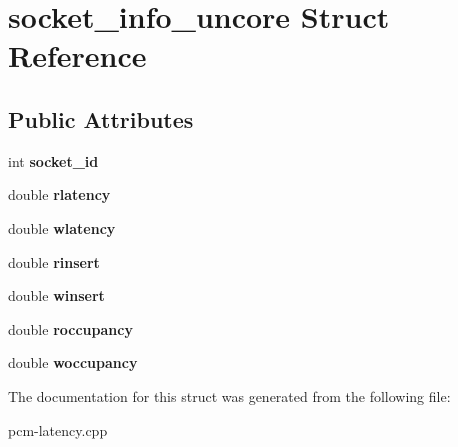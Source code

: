 \section{socket\+\_\+info\+\_\+uncore Struct Reference}
\label{structsocket__info__uncore}
\subsection*{Public Attributes}
\begin{DoxyCompactItemize}
\item 
\mbox{\label{structsocket__info__uncore_a8f10118ed315b4006d82786906e4e84b}} 
int {\bfseries socket\+\_\+id}
\item 
\mbox{\label{structsocket__info__uncore_acc0e6d8e56a541bfc3d01f55a337a4a5}} 
double {\bfseries rlatency}
\item 
\mbox{\label{structsocket__info__uncore_ae1aa840a4fa543a37e024fd9c643af11}} 
double {\bfseries wlatency}
\item 
\mbox{\label{structsocket__info__uncore_a92cb84a8b93d234aeb374f6883fae571}} 
double {\bfseries rinsert}
\item 
\mbox{\label{structsocket__info__uncore_ad544772ca5b28f1622ff0301f6c1bdac}} 
double {\bfseries winsert}
\item 
\mbox{\label{structsocket__info__uncore_aeddc9f897fb364da754a8b8aa7f9b120}} 
double {\bfseries roccupancy}
\item 
\mbox{\label{structsocket__info__uncore_a2af6499e98cbb97ea99c7b4f145da326}} 
double {\bfseries woccupancy}
\end{DoxyCompactItemize}


The documentation for this struct was generated from the following file\+:\begin{DoxyCompactItemize}
\item 
pcm-\/latency.\+cpp\end{DoxyCompactItemize}
